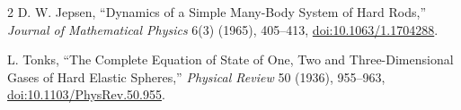 \documentclass[10pt]{article}
\begin{document}
\begin{thebibliography}{2}
D. W. Jepsen,
``Dynamics of a Simple Many-Body System of Hard Rods,''
\emph{Journal of Mathematical Physics} 6(3) (1965), 405--413,
\href{https://doi.org/10.1063/1.1704288}{doi:10.1063/1.1704288}.

L. Tonks,
``The Complete Equation of State of One, Two and Three-Dimensional Gases of
Hard Elastic Spheres,''
\emph{Physical Review} 50 (1936), 955--963,
\href{https://doi.org/10.1103/PhysRev.50.955}{doi:10.1103/PhysRev.50.955}.
\end{thebibliography}
\end{document}
